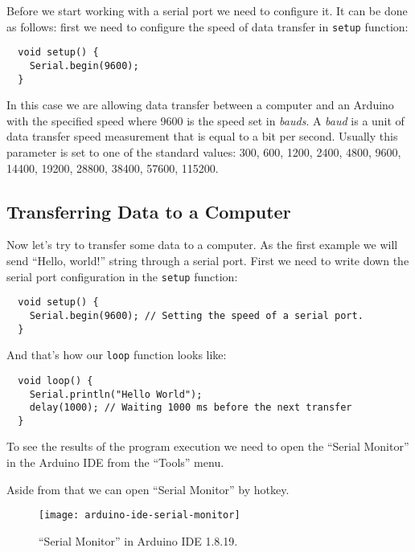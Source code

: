 \documentclass[../sparc.tex]{subfiles}
\begin{document}
Before we start working with a serial port we need to configure it.  It can be
done as follows: first we need to configure the speed of data transfer in
\texttt{setup} function:

\begin{verbatim}
  void setup() {
    Serial.begin(9600);
  }
\end{verbatim}

In this case we are allowing data transfer between a computer and an Arduino
with the specified speed where 9600 is the speed set in \emph{bauds}.  A
\emph{baud} is a unit of data transfer speed measurement that is equal to a bit
per second.  Usually this parameter is set to one of the standard values: 300,
600, 1200, 2400, 4800, 9600, 14400, 19200, 28800, 38400, 57600, 115200.

\subsection{Transferring Data to a Computer}

Now let's try to transfer some data to a computer.  As the first example we will
send ``Hello, world!'' string through a serial port.  First we need to write
down the serial port configuration in the \texttt{setup} function:

\begin{verbatim}
  void setup() {
    Serial.begin(9600); // Setting the speed of a serial port.
  }
\end{verbatim}

And that's how our \texttt{loop} function looks like:

\begin{verbatim}
  void loop() {
    Serial.println("Hello World");
    delay(1000); // Waiting 1000 ms before the next transfer
  }
\end{verbatim}

To see the results of the program execution we need to open the ``Serial
Monitor'' in the Arduino IDE from the ``Tools'' menu.

Aside from that we can open ``Serial Monitor'' by 
hotkey.

\begin{figure}[ht]
  \centering
  \texttt{[image: arduino-ide-serial-monitor]}
  \caption{``Serial Monitor'' in Arduino IDE 1.8.19.}
  \label{fig:arduino-ide-serial-monitor}
\end{figure}
\end{document}
